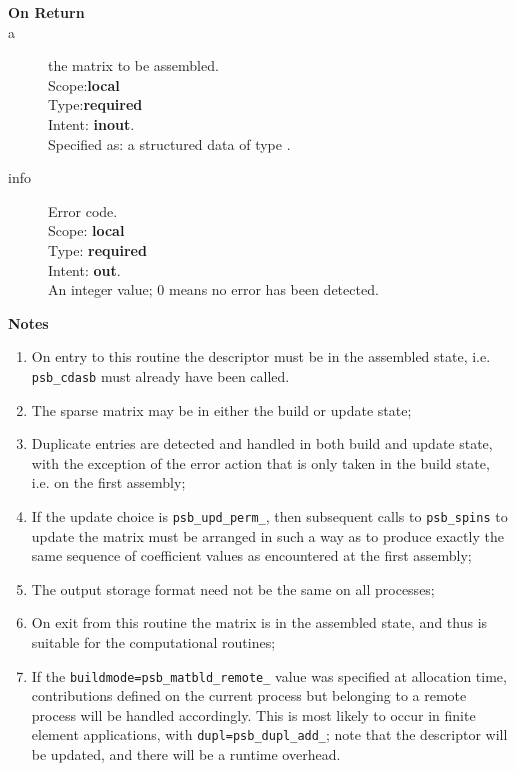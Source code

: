 \begin{description}
\item[\bf On Return]
\item[a] the matrix to be assembled.\\
Scope:{\bf local}\\
Type:{\bf required}\\
Intent: {\bf inout}.\\
Specified as: a structured data of type \spdata.
\item[info] Error code.\\
Scope: {\bf local} \\
Type: {\bf required} \\
Intent: {\bf out}.\\
An integer value; 0 means no error has been detected. 
\end{description}

{\par\noindent\large\bfseries Notes}
\begin{enumerate}
\item On entry to this routine the descriptor must  be in  the
  assembled state, i.e. \verb|psb_cdasb| must already have been called.
\item The sparse matrix may be in either the build or update state;
\item Duplicate entries are detected and handled in both build and
  update state, with the exception of the error action that is only
  taken in the build state, i.e. on the first assembly; 
\item If the update choice is \verb|psb_upd_perm_|, then subsequent
  calls to \verb|psb_spins| to update the matrix must be arranged in
  such a way as to produce exactly the same sequence of coefficient
  values as encountered at the first assembly; 
\item The output storage format need not be the same on all
  processes; 
\item On exit from this routine the matrix is in the assembled state,
  and thus is suitable for the computational routines;
\item If the \verb|buildmode=psb_matbld_remote_| value was specified
  at allocation time, contributions defined on the current process but
  belonging to a remote process will be handled accordingly. This is
  most likely to occur in finite element applications, with
  \verb|dupl=psb_dupl_add_|; note that the descriptor will be updated,
  and there will be a runtime overhead. 
\end{enumerate}



